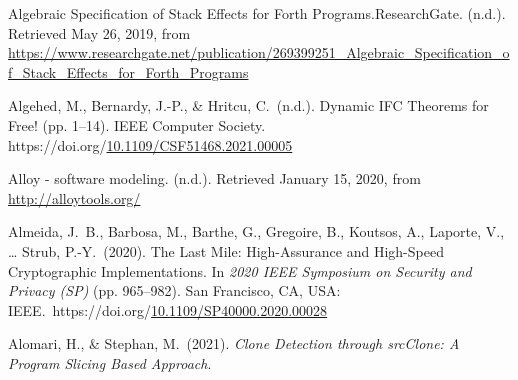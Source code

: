 \documentclass[12pt,twoside]{article}
\begin{document}
{\begin{thebibliography}{1079}
\mdbibitemlabel{}Algebraic Specification of Stack Effects for Forth Programs.ResearchGate. (n.d.). Retrieved May 26, 2019, from \href{https://www.researchgate.net/publication/269399251_Algebraic_Specification_of_Stack_Effects_for_Forth_Programs}{{\ttfamily https://\hspace{0pt}www.\hspace{0pt}researchgate.\hspace{0pt}net/\hspace{0pt}publication/\hspace{0pt}269399251\_\hspace{0pt}Algebraic\_\hspace{0pt}Specification\_\hspace{0pt}of\_\hspace{0pt}Stack\_\hspace{0pt}Effects\_\hspace{0pt}for\_\hspace{0pt}Forth\_\hspace{0pt}Programs}}%

\mdbibitemlabel{}Algehed, M., Bernardy, J.-P., \& Hritcu, C.~(n.d.). Dynamic IFC Theorems for Free! (pp. 1–14). IEEE Computer Society. https://doi.org/\href{https://dx.doi.org/10.1109/CSF51468.2021.00005}{10.1109/CSF51468.2021.00005}%

\mdbibitemlabel{}Alloy - software modeling. (n.d.). Retrieved January 15, 2020, from \href{http://alloytools.org/}{{\ttfamily http://\hspace{0pt}alloytools.\hspace{0pt}org/\hspace{0pt}}}%

\mdbibitemlabel{}Almeida, J.~B., Barbosa, M., Barthe, G., Gregoire, B., Koutsos, A., Laporte, V., … Strub, P.-Y.~(2020). The Last Mile: High-Assurance and High-Speed Cryptographic Implementations. In \emph{2020 IEEE Symposium on Security and Privacy (SP)} (pp. 965–982). San Francisco, CA, USA: IEEE.~https://doi.org/\href{https://dx.doi.org/10.1109/SP40000.2020.00028}{10.1109/SP40000.2020.00028}%

\mdbibitemlabel{}Alomari, H., \& Stephan, M.~(2021). \emph{Clone Detection through srcClone: A Program Slicing Based Approach}.%


\end{thebibliography}}
\end{document}
